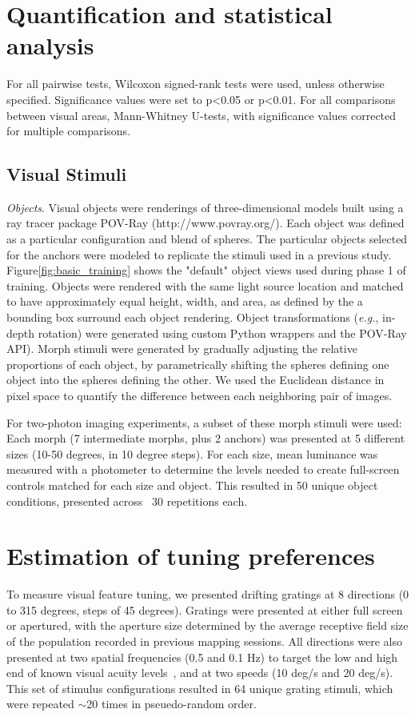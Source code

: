 \section{Quantification and statistical analysis}
For all pairwise tests, Wilcoxon signed-rank tests were used, unless otherwise specified. Significance values were set to p<0.05 or p<0.01. For all comparisons between visual areas, Mann-Whitney U-tests, with significance values corrected for multiple comparisons.

\subsection{Visual Stimuli}
\textit{Objects}. Visual objects were renderings of three-dimensional models built using a ray tracer package POV-Ray (http://www.povray.org/). Each object was defined as a particular configuration and blend of spheres. The particular objects selected for the anchors were modeled to replicate the stimuli used in a previous study\cite{Zoccolan2009}. Figure\ref{fig:basic_training} shows the "default" object views used during phase 1 of training. Objects were rendered with the same light source location and matched to have approximately equal height, width, and area, as defined by the a bounding box surround each object rendering. Object transformations (\textit{e.g.}, in-depth rotation) were generated using custom Python wrappers and the POV-Ray API). Morph stimuli were generated by gradually adjusting the relative proportions of each object, by parametrically shifting the spheres defining one object into the spheres defining the other. We used the Euclidean distance in pixel space to quantify the difference between each neighboring pair of images. 

For two-photon imaging experiments, a subset of these morph stimuli were used: Each morph (7 intermediate morphs, plus 2 anchors) was presented at 5 different sizes (10-50 degrees, in 10 degree steps). For each size, mean luminance was measured with a photometer to determine the levels needed to create full-screen controls matched for each size and object. This resulted in 50 unique object conditions, presented across ~30 repetitions each.

\section{Estimation of tuning preferences}
To measure visual feature tuning, we presented drifting gratings at 8 directions (0 to 315 degrees, steps of 45 degrees). Gratings were presented at either full screen or apertured, with the aperture size determined by the average receptive field size of the population recorded in previous  mapping sessions.  All directions were also presented at two spatial frequencies (0.5 and 0.1 Hz) to target the low and high end of known visual acuity levels~\cite{stuff}, and at two speeds (10 deg/s and 20 deg/s). This set of stimulus configurations resulted in 64 unique grating stimuli, which were repeated $\sim$20 times in pseuedo-random order.

